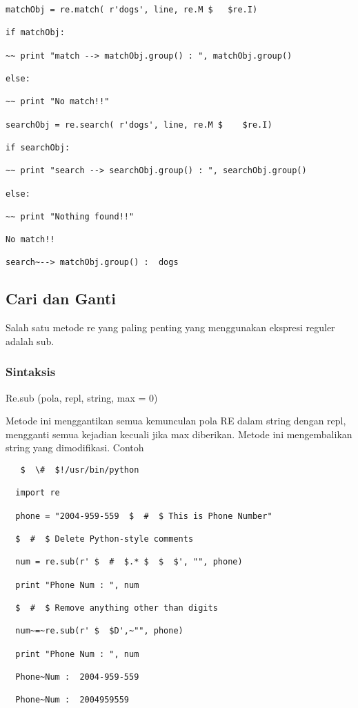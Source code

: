 \begin {enumerate}
\begin {enumerate}
\begin{verbatim}
matchObj = re.match( r'dogs', line, re.M $   $re.I)

if matchObj:

~~ print "match --> matchObj.group() : ", matchObj.group()

else:

~~ print "No match!!"

searchObj = re.search( r'dogs', line, re.M $    $re.I)

if searchObj:

~~ print "search --> searchObj.group() : ", searchObj.group()

else:

~~ print "Nothing found!!"

No match!!

search~--> matchObj.group() :  dogs
\end{verbatim}


\subsection{Cari dan Ganti}
Salah satu metode re yang paling penting yang menggunakan ekspresi reguler adalah sub.

  \subsubsection{Sintaksis}
  Re.sub (pola, repl, string, max = 0)

  Metode ini menggantikan semua kemunculan pola RE dalam string dengan repl, mengganti semua kejadian kecuali jika max diberikan. Metode ini mengembalikan string yang dimodifikasi.
  Contoh
  \begin{verbatim}
   $  \#  $!/usr/bin/python

  import re

  phone = "2004-959-559  $  #  $ This is Phone Number"

  $  #  $ Delete Python-style comments

  num = re.sub(r' $  #  $.* $  $  $', "", phone)

  print "Phone Num : ", num

  $  #  $ Remove anything other than digits

  num~=~re.sub(r' $  $D',~"", phone)

  print "Phone Num : ", num

  Phone~Num :  2004-959-559

  Phone~Num :  2004959559
  \end{verbatim}


\end{enumerate}
\end{enumerate}
